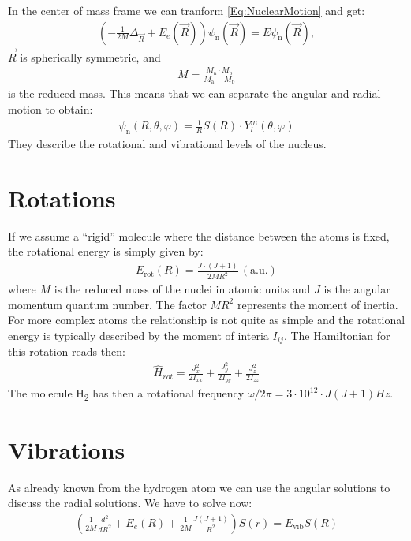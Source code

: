 \documentclass[10pt]{article}
\begin{document}
In the center of mass frame we can tranform \eqref{Eq:NuclearMotion} and get: 
\begin{align}
\left( - \frac{1}{2M} \Delta_{\vec{R}} + E_e (\vec{R}) \right) \psi_\textrm{n} (\vec{R}) = E \psi_\textrm{n} (\vec{R}),
\end{align}
$\vec{R}$ is spherically symmetric, and
\begin{align}
M = \frac{M_\textrm{a} \cdot M_\textrm{b}}{M_\textrm{a} + M_\textrm{b}}
\end{align}
is the reduced mass. This means that we can separate the angular  and radial motion to obtain:
\begin{align}
\psi_\textrm{n} (R,\theta,\varphi) = \frac{1}{R} S(R) \cdot Y_l^m (\theta,\varphi)
\end{align}
They describe the rotational and vibrational levels of the nucleus.


\section{Rotations}
If we assume a ``rigid'' molecule where the distance between the atoms is fixed, the rotational energy is simply given by:
\begin{align}
E_\text{rot} (R) = \frac{J\cdot (J+1)}{2M R^2}\, (\text{a.u.})
\end{align}
where $M$ is the reduced mass of the nuclei in atomic units and $J$ is the angular momentum quantum number. The factor $MR^2$ represents the moment of inertia. For more complex atoms the relationship is not quite as simple and the rotational energy is typically described by the moment of interia $I_{ij}$. The Hamiltonian for this rotation reads then:
\begin{align}
\hat{H}_{rot} =\frac{J_x^2}{2I_{xx}}+\frac{J_y^2}{2I_{yy}}+\frac{J_z^2}{2I_{zz}}
\end{align}
The molecule H\textsubscript{2} has then a rotational frequency $\omega/2\pi =3\cdot 10^{12}\cdot J(J+1) \si{Hz}$.

\section{Vibrations}
As already known from the hydrogen atom we can use the angular solutions to discuss the radial solutions. We have to solve now:
\begin{align}
\left( \frac{1}{2M} \frac{d^2}{dR^2} + E_e (R) + \frac{1}{2M} \frac{J(J+1)}{R^2} \right) S(r) = E_\text{vib} S(R)
\end{align}
\end{document}
